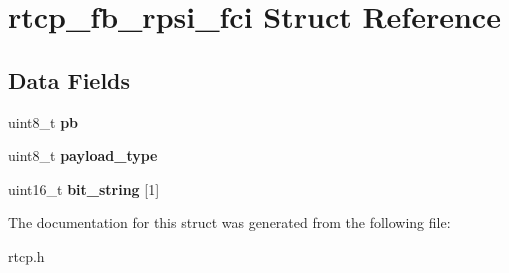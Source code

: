 \section{rtcp\+\_\+fb\+\_\+rpsi\+\_\+fci Struct Reference}
\label{structrtcp__fb__rpsi__fci}
\subsection*{Data Fields}
\begin{DoxyCompactItemize}
\item 
\mbox{\label{structrtcp__fb__rpsi__fci_a76e78672f337d2543f056a82bc3b8516}} 
uint8\+\_\+t {\bfseries pb}
\item 
\mbox{\label{structrtcp__fb__rpsi__fci_afe34ce2207fccdba842dd78951c4ba6c}} 
uint8\+\_\+t {\bfseries payload\+\_\+type}
\item 
\mbox{\label{structrtcp__fb__rpsi__fci_aa67d8a2dad637ff7221783b94a6de75d}} 
uint16\+\_\+t {\bfseries bit\+\_\+string} [1]
\end{DoxyCompactItemize}


The documentation for this struct was generated from the following file\+:\begin{DoxyCompactItemize}
\item 
rtcp.\+h\end{DoxyCompactItemize}
